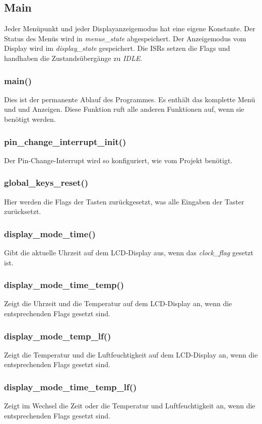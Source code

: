 \documentclass[10pt]{scrartcl}
\begin{document}
\subsection{Main}
Jeder Menüpunkt und jeder Displayanzeigemodus hat eine eigene Konstante. Der Status des Menüs wird in \textit{menue\_state} abgespeichert. Der Anzeigemodus vom Display wird im \textit{display\_state} gespeichert. Die ISRs setzen die Flags und handhaben die Zustandsübergänge zu \textit{IDLE}.
\subsubsection{main()}
Dies ist der permanente Ablauf des Programmes. Es enthält das komplette Menü und und Anzeigen. Diese Funktion ruft alle anderen Funktionen auf, wenn sie benötigt werden.
\subsubsection{pin\_change\_interrupt\_init()}
Der Pin-Change-Interrupt wird so konfiguriert, wie vom Projekt benötigt.
\subsubsection{global\_keys\_reset()}
Hier werden die Flags der Tasten zurückgesetzt, was alle Eingaben der Taster zurücksetzt.
\subsubsection{display\_mode\_time()}
Gibt die aktuelle Uhrzeit auf dem LCD-Display aus, wenn das \textit{clock\_flag} gesetzt ist.
\subsubsection{display\_mode\_time\_temp()}
Zeigt die Uhrzeit und die Temperatur auf dem LCD-Display an, wenn die entsprechenden Flags gesetzt sind.
\subsubsection{display\_mode\_temp\_lf()}
Zeigt die Temperatur und die Luftfeuchtigkeit auf dem LCD-Display an, wenn die entsprechenden Flags gesetzt sind.
\subsubsection{display\_mode\_time\_temp\_lf()}
Zeigt im Wechsel die Zeit oder die Temperatur und Luftfeuchtigkeit an, wenn die entsprechenden Flags gesetzt sind.
\end{document}
